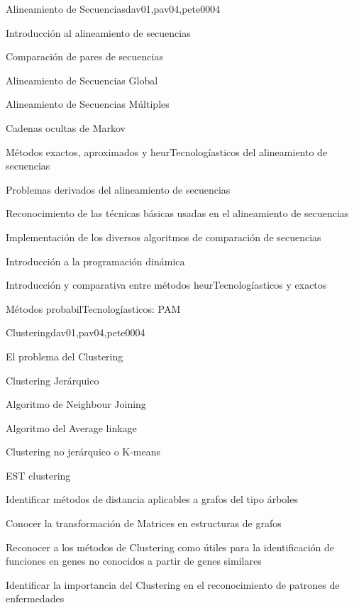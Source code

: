 \begin{syllabus}
\begin{unit}{Alineamiento de Secuencias}{dav01,pav04,pete00}{0}{4}
\begin{topics}
        \item Introducción al alineamiento de secuencias
        \item Comparación de pares de secuencias
        \item Alineamiento de Secuencias Global
        \item Alineamiento de Secuencias Múltiples
        \item Cadenas ocultas de Markov
        \item Métodos exactos, aproximados y heurTecnologíasticos del alineamiento de secuencias
        \item Problemas derivados del alineamiento de secuencias
    \end{topics}
    \begin{unitgoals}
        \item Reconocimiento de las técnicas básicas usadas en el alineamiento de secuencias
        \item Implementación de los diversos algoritmos de comparación de secuencias
        \item Introducción a la programación dinámica
        \item Introducción y comparativa entre métodos heurTecnologíasticos y exactos
        \item Métodos probabilTecnologíasticos: PAM
    \end{unitgoals}
\end{unit}

\begin{unit}{Clustering}{dav01,pav04,pete00}{0}{4}
\begin{topics}
        \item El problema del Clustering
        \item Clustering Jerárquico
        \item Algoritmo de Neighbour Joining
        \item Algoritmo del Average linkage
        \item Clustering no jerárquico o K-means
        \item EST clustering
    \end{topics}
    \begin{unitgoals}
        \item Identificar métodos de distancia aplicables a grafos del tipo árboles
        \item Conocer la transformación de Matrices en estructuras de grafos
        \item Reconocer a los métodos de Clustering como útiles para la identificación de funciones en genes no conocidos a partir de genes similares
        \item Identificar la importancia del Clustering en el reconocimiento de patrones de enfermedades
    \end{unitgoals}
\end{unit}


\end{syllabus}
